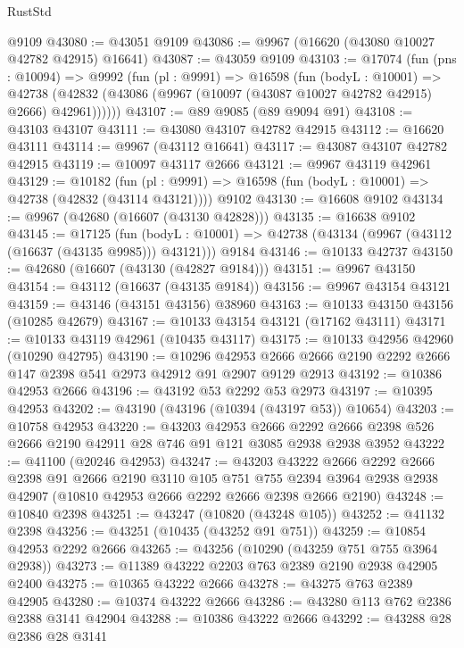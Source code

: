 \begin{lexlean}{RustStd}
\begin{coremodule}
    @9109
@43080 := @43051 @9109
@43086 := @9967 (@16620 (@43080 @10027 @42782 @42915) @16641)
@43087 := @43059 @9109
@43103 := @17074
    (fun (pns : @10094) =>
    @9992
      (fun (pl : @9991) =>
      @16598
        (fun (bodyL : @10001) =>
        @42738 (@42832 (@43086 (@9967 (@10097 (@43087 @10027 @42782 @42915) @2666) @42961))))))
@43107 := @89 @9085 (@89 @9094 @91)
@43108 := @43103 @43107
@43111 := @43080 @43107 @42782 @42915
@43112 := @16620 @43111
@43114 := @9967 (@43112 @16641)
@43117 := @43087 @43107 @42782 @42915
@43119 := @10097 @43117 @2666
@43121 := @9967 @43119 @42961
@43129 := @10182
    (fun (pl : @9991) => @16598 (fun (bodyL : @10001) => @42738 (@42832 (@43114 @43121))))
    @9102
@43130 := @16608 @9102
@43134 := @9967 (@42680 (@16607 (@43130 @42828)))
@43135 := @16638 @9102
@43145 := @17125
    (fun (bodyL : @10001) => @42738 (@43134 (@9967 (@43112 (@16637 (@43135 @9985))) @43121)))
    @9184
@43146 := @10133 @42737
@43150 := @42680 (@16607 (@43130 (@42827 @9184)))
@43151 := @9967 @43150
@43154 := @43112 (@16637 (@43135 @9184))
@43156 := @9967 @43154 @43121
@43159 := @43146 (@43151 @43156) @38960
@43163 := @10133 @43150 @43156 (@10285 @42679)
@43167 := @10133 @43154 @43121 (@17162 @43111)
@43171 := @10133 @43119 @42961 (@10435 @43117)
@43175 := @10133 @42956 @42960 (@10290 @42795)
@43190 := @10296
    @42953
    @2666
    @2666
    @2190
    @2292
    @2666
    @147
    @2398
    @541
    @2973
    @42912
    @91
    @2907
    @9129
    @2913
@43192 := @10386 @42953 @2666
@43196 := @43192 @53 @2292 @53 @2973
@43197 := @10395 @42953
@43202 := @43190 (@43196 (@10394 (@43197 @53)) @10654)
@43203 := @10758 @42953
@43220 := @43203
    @42953
    @2666
    @2292
    @2666
    @2398
    @526
    @2666
    @2190
    @42911
    @28
    @746
    @91
    @121
    @3085
    @2938
    @2938
    @3952
@43222 := @41100 (@20246 @42953)
@43247 := @43203
    @43222
    @2666
    @2292
    @2666
    @2398
    @91
    @2666
    @2190
    @3110
    @105
    @751
    @755
    @2394
    @3964
    @2938
    @2938
    @42907
    (@10810 @42953 @2666 @2292 @2666 @2398 @2666 @2190)
@43248 := @10840 @2398
@43251 := @43247 (@10820 (@43248 @105))
@43252 := @41132 @2398
@43256 := @43251 (@10435 (@43252 @91 @751))
@43259 := @10854 @42953 @2292 @2666
@43265 := @43256 (@10290 (@43259 @751 @755 @3964 @2938))
@43273 := @11389 @43222 @2203 @763 @2389 @2190 @2938 @42905 @2400
@43275 := @10365 @43222 @2666
@43278 := @43275 @763 @2389 @42905
@43280 := @10374 @43222 @2666
@43286 := @43280 @113 @762 @2386 @2388 @3141 @42904
@43288 := @10386 @43222 @2666
@43292 := @43288 @28 @2386 @28 @3141

\end{coremodule}
\end{lexlean}
